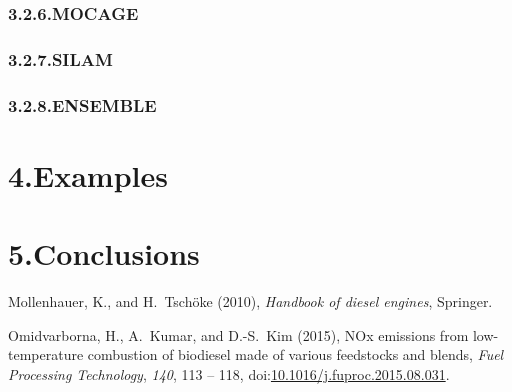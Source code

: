 \documentclass[9pt]{report}
\begin{document}
\subsubsection{3.2.6.\hspace*{0.5em}MOCAGE}\label{sec-mocage}%

\subsubsection{3.2.7.\hspace*{0.5em}SILAM}\label{sec-silam}%

\subsubsection{3.2.8.\hspace*{0.5em}ENSEMBLE}\label{sec-ensemble}%

\section{4.\hspace*{0.5em}Examples}\label{sec-examples}%

\section{5.\hspace*{0.5em}Conclusions}\label{sec-conclusions}%

{\mdsupressbiblabel{}\begin{thebibliography}{2}%
\label{sec-bibliography}%

\mdbibitemlabel{}Mollenhauer, K., and H.~Tschöke (2010), \emph{Handbook of diesel engines}, Springer.\label{mollenhauer2010handbook}%

\mdbibitemlabel{}Omidvarborna, H., A.~Kumar, and D.-S.~Kim (2015), NOx emissions from low-temperature combustion of biodiesel made of various feedstocks and blends, \emph{Fuel Processing Technology}, \emph{140}, 113 – 118, doi:\href{https://dx.doi.org/10.1016/j.fuproc.2015.08.031}{10.1016/j.fuproc.2015.08.031}.\label{omidvarborna2015113}%
\par%
\end{thebibliography}}%
\end{document}
